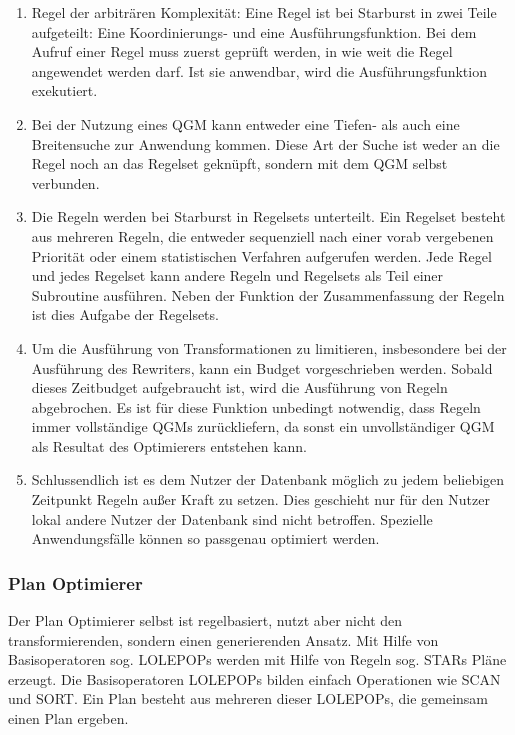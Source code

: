\begin{enumerate}
\item Regel der arbiträren Komplexität: Eine Regel ist bei Starburst in zwei Teile aufgeteilt: Eine Koordinierungs- und eine Ausführungsfunktion. Bei dem Aufruf einer Regel muss zuerst geprüft werden, in wie weit die Regel angewendet werden darf. Ist sie anwendbar, wird die Ausführungsfunktion exekutiert.

\item Bei der Nutzung eines \ac{QGM} kann entweder eine Tiefen- als auch eine Breitensuche zur Anwendung kommen. Diese Art der Suche ist weder an die Regel noch an das Regelset geknüpft, sondern mit dem QGM selbst verbunden.


\item Die Regeln werden bei Starburst in Regelsets unterteilt. Ein Regelset besteht aus mehreren Regeln, die entweder sequenziell nach einer vorab vergebenen Priorität oder einem statistischen Verfahren aufgerufen werden. Jede Regel und jedes Regelset kann andere Regeln und Regelsets als Teil einer Subroutine ausführen. Neben der Funktion der Zusammenfassung der Regeln ist dies Aufgabe der Regelsets.

\item Um die Ausführung von Transformationen zu limitieren, insbesondere bei der Ausführung des Rewriters, kann ein Budget vorgeschrieben werden. Sobald dieses Zeitbudget aufgebraucht ist, wird die Ausführung von Regeln abgebrochen. Es ist für diese Funktion unbedingt notwendig, dass Regeln immer vollständige QGMs zurückliefern, da sonst ein unvollständiger QGM als Resultat des Optimierers entstehen kann.

\item Schlussendlich ist es dem Nutzer der Datenbank möglich zu jedem beliebigen Zeitpunkt Regeln außer Kraft zu setzen. Dies geschieht nur für den Nutzer lokal andere Nutzer der Datenbank sind nicht betroffen. Spezielle Anwendungsfälle können so passgenau optimiert werden.
\end{enumerate}

\subsubsection{Plan Optimierer}

Der Plan Optimierer selbst ist regelbasiert, nutzt aber nicht den transformierenden, sondern einen generierenden Ansatz. Mit Hilfe von Basisoperatoren sog. \ac{LOLEPOP}s werden mit Hilfe von Regeln sog. \ac{STAR}s Pläne erzeugt. Die Basisoperatoren \ac{LOLEPOP}s bilden einfach Operationen wie SCAN und SORT. Ein Plan besteht aus mehreren dieser \ac{LOLEPOP}s, die gemeinsam einen Plan ergeben.

